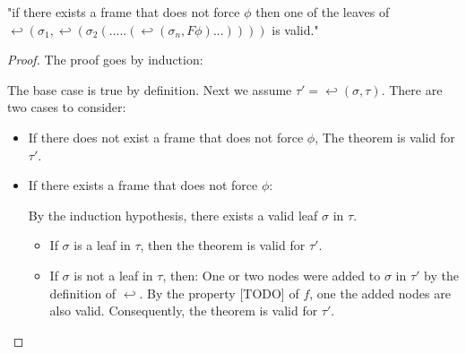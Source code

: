 \documentclass[runningheads]{llncs}
\begin{document}
\begin{theorem}
    "if there exists a frame that does not force $\phi$ then one of the leaves of $ \hookleftarrow (\sigma_1,\hookleftarrow(\sigma_2(.....(\hookleftarrow(\sigma_n , F\phi)...)))) $ is valid."
\end{theorem}

\begin{proof}

    The proof goes by induction:


             The base case is true by definition. Next we assume $\tau' = \hookleftarrow (\sigma, \tau)$.
             There are two cases to consider:
            \begin{itemize}
                \item If there does not exist a frame that does not force $\phi$, The theorem is valid for $\tau'$.
                \item  If there exists a frame that does not force $\phi$:

                         By the induction hypothesis, there exists a valid leaf $\sigma$ in $\tau$.
                         \begin{itemize}
                    \item If $\sigma$ is a leaf in $\tau$, then the theorem is valid for $\tau'$.
                    \item If $\sigma$ is not a leaf in $\tau$, then:
                         One or two nodes were added to $\sigma$ in $\tau'$ by the definition of $\hookleftarrow$.
                         By the property [TODO] of $f$, one the added nodes are also valid.
                         Consequently, the theorem is valid for $\tau'$.

            \end{itemize}
            \end{itemize}
    \end{proof}
\end{document}
